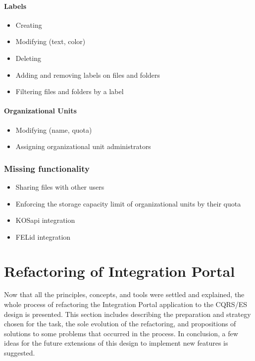 \documentclass{book}
\begin{document}
\paragraph{Labels}\label{labels}

\begin{itemize}
\tightlist
\item
  Creating
\item
  Modifying (text, color)
\item
  Deleting
\item
  Adding and removing labels on files and folders
\item
  Filtering files and folders by a label
\end{itemize}

\paragraph{Organizational Units}\label{organizational-units}

\begin{itemize}
\tightlist
\item
  Modifying (name, quota)
\item
  Assigning organizational unit administrators
\end{itemize}

\subsubsection{Missing functionality}\label{missing-functionality}

\begin{itemize}
\tightlist
\item
  Sharing files with other users
\item
  Enforcing the storage capacity limit of organizational units by their
  quota
\item
  KOSapi integration
\item
  FELid integration
\end{itemize}


\section{Refactoring of Integration
Portal}\label{refactoring-of-integration-portal}

Now that all the principles, concepts, and tools were settled and
explained, the whole process of refactoring the Integration Portal
application to the CQRS/ES design is presented. This section includes
describing the preparation and strategy chosen for the task, the sole
evolution of the refactoring, and propositions of solutions to some
problems that occurred in the process. In conclusion, a few ideas for
the future extensions of this design to implement new features is
suggested.
\end{document}
